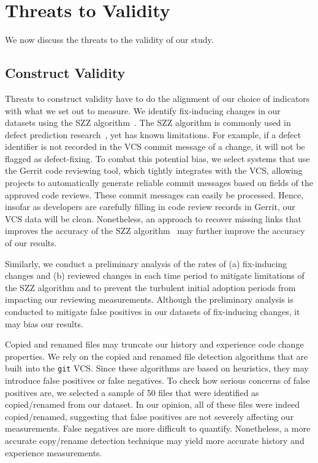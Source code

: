 \section{Threats to Validity}
\label{sec:threats}

We now discuss the threats to the validity of our study.

\subsection{Construct Validity}
\label{sec:cthreats}

Threats to construct validity have to do the alignment of our choice of indicators with what we set out to measure.
We identify fix-inducing changes in our datasets using the SZZ algorithm~\cite{sliwerski2005msr}.
The SZZ algorithm is commonly used in defect prediction research~\cite{kim2008tse, kamei2013tse, kamei2016emse, kononenko2015icsme}, yet has known limitations.
For example, if a defect identifier is not recorded in the VCS commit message of a change, it will not be flagged as defect-fixing.
To combat this potential bias, we select systems that use the Gerrit code reviewing tool, which tightly integrates with the VCS, allowing projects to automatically generate reliable commit messages based on fields of the approved code reviews.
These commit messages can easily be processed.
Hence, insofar as developers are carefully filling in code review records in Gerrit, our VCS data will be clean.
Nonetheless, an approach to recover missing links that improves the accuracy of the SZZ algorithm~\cite{wu2011fse} may further improve the accuracy of our results.

Similarly, we conduct a preliminary analysis of the rates of
(a) fix-inducing changes and
(b) reviewed changes in each time period to mitigate limitations of the SZZ algorithm and to prevent the turbulent initial adoption periods from impacting our reviewing measurements.
Although the preliminary analysis is conducted to mitigate false positives in our datasets of fix-inducing changes, it may bias our results.

Copied and renamed files may truncate our history and experience code change properties.
We rely on the copied and renamed file detection algorithms that are built into the {\tt git} VCS.
Since these algorithms are based on heuristics, they may introduce false positives or false negatives.
To check how serious concerns of false positives are, we selected a sample of 50 files that were identified as copied/renamed from our dataset.
In our opinion, all of these files were indeed copied/renamed, suggesting that false positives are not severely affecting our measurements.
False negatives are more difficult to quantify.
Nonetheless, a more accurate copy/rename detection technique may yield more accurate history and experience measurements.

